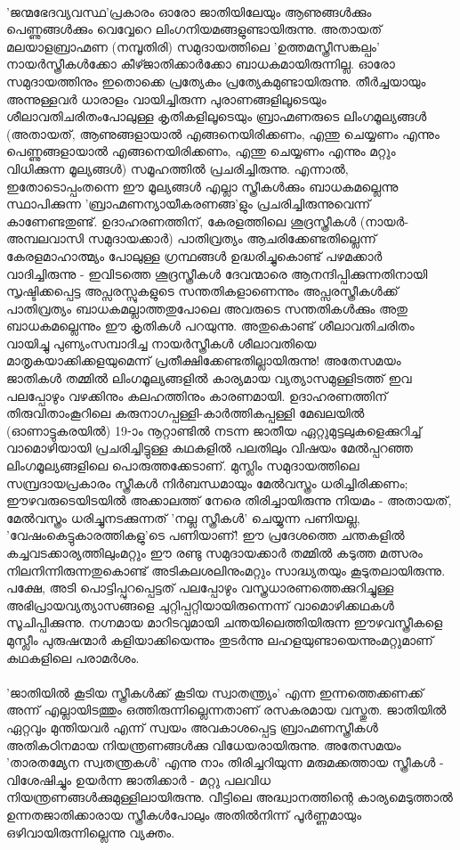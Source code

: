 \paragraph{}'ജന്മഭേദവ്യവസ്ഥ'പ്രകാരം ഓരോ ജാതിയിലേയും ആണുങ്ങൾക്കും പെണ്ണുങ്ങൾക്കും വെവ്വേറെ ലിംഗനിയമങ്ങളുണ്ടായിരുന്നു. അതായത് മലയാളബ്രാഹ്മണ (നമ്പൂതിരി) സമുദായത്തിലെ 'ഉത്തമസ്ത്രീസങ്കല്പം' നായർസ്ത്രീകൾക്കോ കീഴ്ജാതിക്കാർക്കോ ബാധകമായിരുന്നില്ല. ഓരോ സമുദായത്തിനും ഇതൊക്കെ പ്രത്യേകം പ്രത്യേകമുണ്ടായിരുന്നു. തീർച്ചയായും അന്നുള്ളവർ ധാരാളം വായിച്ചിരുന്ന പുരാണങ്ങളിലൂടെയും ശീലാവതിചരിതംപോലുള്ള കൃതികളിലൂടെയും ബ്രാഹ്മണരുടെ ലിംഗമൂല്യങ്ങൾ (അതായത്, ആണുങ്ങളായാൽ എങ്ങനെയിരിക്കണം, എന്തു ചെയ്യണം എന്നും പെണ്ണുങ്ങളായാൽ എങ്ങനെയിരിക്കണം, എന്തു ചെയ്യണം എന്നും മറ്റും വിധിക്കുന്ന മൂല്യങ്ങൾ) സമൂഹത്തിൽ പ്രചരിച്ചിരുന്നു. എന്നാൽ, ഇതോടൊപ്പംതന്നെ ഈ മൂല്യങ്ങൾ എല്ലാ സ്ത്രീകൾക്കും ബാധകമല്ലെന്നു സ്ഥാപിക്കുന്ന 'ബ്രാഹ്മണന്യായീകരണങ്ങ'ളും പ്രചരിച്ചിരുന്നുവെന്ന് കാണേണ്ടതുണ്ട്. ഉദാഹരണത്തിന്, കേരളത്തിലെ ശൂദ്രസ്ത്രീകൾ (നായർ-അമ്പലവാസി സമുദായക്കാർ) പാതിവ്രത്യം ആചരിക്കേണ്ടതില്ലെന്ന് കേരളമാഹാത്മ്യം പോലുള്ള ഗ്രന്ഥങ്ങൾ ഉദ്ധരിച്ചുകൊണ്ട് പഴമക്കാർ വാദിച്ചിരുന്നു - ഇവിടത്തെ ശൂദ്രസ്ത്രീകൾ ദേവന്മാരെ ആനന്ദിപ്പിക്കുന്നതിനായി സൃഷ്ടിക്കപ്പെട്ട അപ്സരസ്സുകളുടെ സന്തതികളാണെന്നും അപ്സരസ്ത്രീകൾക്ക് പാതിവ്രത്യം ബാധകമല്ലാത്തതുപോലെ അവരുടെ സന്തതികൾക്കും അതു ബാധകമല്ലെന്നും ഈ കൃതികൾ പറയുന്നു. അതുകൊണ്ട് ശീലാവതിചരിതം വായിച്ചു പുണ്യംസമ്പാദിച്ച നായർസ്ത്രീകൾ ശീലാവതിയെ മാതൃകയാക്കിക്കളയുമെന്ന് പ്രതീക്ഷിക്കേണ്ടതില്ലായിരുന്നു! അതേസമയം ജാതികൾ തമ്മിൽ ലിംഗമൂല്യങ്ങളിൽ കാര്യമായ വ്യത്യാസമുള്ളിടത്ത് ഇവ പലപ്പോഴും വഴക്കിനും കലഹത്തിനും കാരണമായി. ഉദാഹരണത്തിന് തിരുവിതാംകൂറിലെ കരുനാഗപ്പള്ളി-കാർത്തികപ്പള്ളി മേഖലയിൽ (ഓണാട്ടുകരയിൽ) 19-ാം നൂറ്റാണ്ടിൽ നടന്ന ജാതീയ ഏറ്റുമുട്ടലുകളെക്കുറിച്ച് വാമൊഴിയായി പ്രചരിച്ചിട്ടുള്ള കഥകളിൽ പലതിലും വിഷയം മേൽപ്പറഞ്ഞ ലിംഗമൂല്യങ്ങളിലെ പൊരുത്തക്കേടാണ്. മുസ്ലിം സമുദായത്തിലെ സമ്പ്രദായപ്രകാരം സ്ത്രീകൾ നിർബന്ധമായും മേൽവസ്ത്രം ധരിച്ചിരിക്കണം; ഈഴവരുടെയിടയിൽ അക്കാലത്ത് നേരെ തിരിച്ചായിരുന്നു നിയമം - അതായത്, മേൽവസ്ത്രം ധരിച്ചുനടക്കുന്നത് 'നല്ല സ്ത്രീകൾ' ചെയ്യുന്ന പണിയല്ല, 'വേഷംകെട്ടുകാരത്തികളു'ടെ പണിയാണ്! ഈ പ്രദേശത്തെ ചന്തകളിൽ കച്ചവടക്കാര്യത്തിലുംമറ്റും ഈ രണ്ടു സമുദായക്കാർ തമ്മിൽ കടുത്ത മത്സരം നിലനിന്നിരുന്നതുകൊണ്ട് അടികലശലിനുംമറ്റും സാദ്ധ്യതയും കൂടുതലായിരുന്നു. പക്ഷേ, അടി പൊട്ടിപ്പുറപ്പെട്ടത് പലപ്പോഴും വസ്ത്രധാരണത്തെക്കുറിച്ചുള്ള അഭിപ്രായവ്യത്യാസങ്ങളെ ചുറ്റിപ്പറ്റിയായിരുന്നെന്ന് വാമൊഴിക്കഥകൾ സൂചിപ്പിക്കുന്നു. നഗ്നമായ മാറിടവുമായി ചന്തയിലെത്തിയിരുന്ന ഈഴവസ്ത്രീകളെ മുസ്ലീം പുരുഷന്മാർ കളിയാക്കിയെന്നും തുടർന്നു ലഹളയുണ്ടായെന്നുംമറ്റുമാണ് കഥകളിലെ പരാമർശം.


\paragraph{}'ജാതിയിൽ കൂടിയ സ്ത്രീകൾക്ക് കൂടിയ സ്വാതന്ത്ര്യം' എന്ന ഇന്നത്തെക്കണക്ക് അന്ന് എല്ലായിടത്തും ഒത്തിരുന്നില്ലെന്നതാണ് രസകരമായ വസ്തുത. ജാതിയിൽ ഏറ്റവും മുന്തിയവർ എന്ന് സ്വയം അവകാശപ്പെട്ട ബ്രാഹ്മണസ്ത്രീകൾ അതികഠിനമായ നിയന്ത്രണങ്ങൾക്കു വിധേയരായിരുന്നു. അതേസമയം 'താരതമ്യേന സ്വതന്ത്രകൾ' എന്നു നാം തിരിച്ചറിയുന്ന മരുമക്കത്തായ സ്ത്രീകൾ - വിശേഷിച്ചും ഉയർന്ന ജാതിക്കാർ - മറ്റു പലവിധ നിയന്ത്രണങ്ങൾക്കുമുള്ളിലായിരുന്നു. വീട്ടിലെ അദ്ധ്വാനത്തിന്റെ കാര്യമെടുത്താൽ ഉന്നതജാതിക്കാരായ സ്ത്രീകൾപോലും അതിൽനിന്ന് പൂർണ്ണമായും ഒഴിവായിരുന്നില്ലെന്നു വ്യക്തം.


